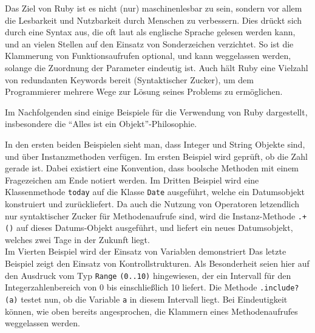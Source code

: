 Das Ziel von Ruby ist es nicht (nur) maschinenlesbar zu sein, sondern vor allem die Lesbarkeit und Nutzbarkeit durch Menschen zu verbessern. Dies drückt sich durch eine Syntax aus, die oft laut als englische Sprache gelesen werden kann, und an vielen Stellen auf den Einsatz von Sonderzeichen verzichtet. So ist die Klammerung von Funktionsaufrufen optional, und kann weggelassen werden, solange die Zuordnung der Parameter eindeutig ist. Auch hält Ruby eine Vielzahl von redundanten Keywords bereit (Syntaktischer Zucker), um dem Programmierer mehrere Wege zur Lösung seines Problems zu ermöglichen.

\setlength{\epigraphwidth}{\marginparwidth}
\setlength{\epigraphwidth}{0.8\textwidth}

Im Nachfolgenden sind einige Beispiele für die Verwendung von Ruby dargestellt, insbesondere die "`Alles ist ein Objekt"'-Philosophie.

 \begin{ruby}[label=Interaktive Ruby Sitzung (IRB)]
    
      
    
     
 \end{ruby}

In den ersten beiden Beispielen sieht man, dass Integer und String Objekte sind, und über Instanzmethoden verfügen. Im ersten Beispiel wird geprüft, ob die Zahl gerade ist. Dabei existiert eine Konvention, dass boolsche Methoden mit einem Fragezeichen am Ende notiert werden. Im Dritten Beispiel wird eine Klassenmethode \texttt{today} auf die Klasse \texttt{Date} ausgeführt, welche ein Datumsobjekt konstruiert und zurückliefert. Da auch die Nutzung von Operatoren letzendlich nur syntaktischer Zucker für Methodenaufrufe sind, wird die Instanz-Methode \texttt{.+()} auf dieses Datums-Objekt ausgeführt, und liefert ein neues Datumsobjekt, welches zwei Tage in der Zukunft liegt.\\
Im Vierten Beispiel wird der Einsatz von Variablen demonstriert
Das letzte Beispiel zeigt den Einsatz von Kontrollstrukturen. Als Besonderheit seien hier auf den Ausdruck vom Typ \texttt{Range} \texttt{(0..10)} hingewiesen, der ein Intervall für den Integerzahlenbereich von 0 bis einschließlich 10 liefert. Die Methode \texttt{.include?(a)} testet nun, ob die Variable \texttt{a} in diesem Intervall liegt. Bei Eindeutigkeit können, wie oben bereits angesprochen, die Klammern eines Methodenaufrufes weggelassen werden.

